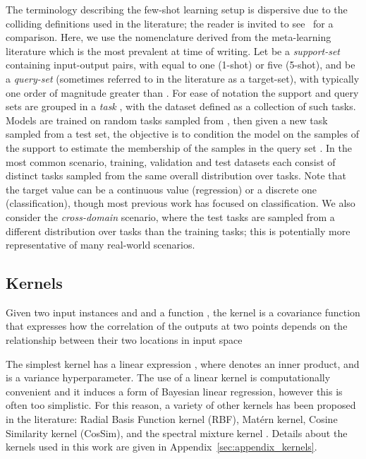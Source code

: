 \documentclass{article}
\begin{document}
The terminology describing the few-shot learning setup is dispersive due to the colliding definitions used in the literature; the reader is invited to see~\citet{chen2019closerfewshot} for a comparison. Here, we use the nomenclature derived from the meta-learning literature which is the most prevalent at time of writing. Let  be a \emph{support-set} containing input-output pairs, with  equal to one (1-shot) or five (5-shot), and   be a \emph{query-set} (sometimes referred to in the literature as a target-set), with  typically one order of magnitude greater than . For ease of notation the support and query sets are grouped in a \emph{task} , with the dataset  defined as a collection of such tasks. Models are trained on random tasks sampled from , then given a new task  sampled from a test set, the objective is to condition the model on the samples of the support  to estimate the membership of the samples in the query set . In the most common scenario, training, validation and test datasets each consist of distinct tasks sampled from the same overall distribution over tasks. Note that the target value  can be a continuous value (regression) or a discrete one (classification), though most previous work has focused on classification. We also consider the \emph{cross-domain} scenario, where the test tasks are sampled from a different distribution over tasks than the training tasks; this is potentially more representative of many real-world scenarios.

\subsection{Kernels}

Given two input instances  and  and a function , the kernel  is a covariance function that expresses how the correlation of the outputs at two points depends on the relationship between their two locations in input space

The simplest kernel has a linear expression , where  denotes an inner product, and  is a variance hyperparameter. The use of a linear kernel is computationally convenient and it induces a form of Bayesian linear regression, however this is often too simplistic. For this reason, a variety of other kernels has been proposed in the literature: Radial Basis Function kernel (RBF), Mat\'ern kernel, Cosine Similarity kernel (CosSim), and the spectral mixture kernel \citep{wilson2013gaussian}. Details about the kernels used in this work are given in Appendix~\ref{sec:appendix_kernels}.
\end{document}
